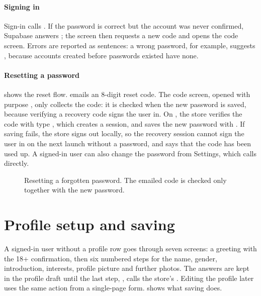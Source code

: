 \paragraph{Signing in} Sign-in calls . If the password is correct but the
account was never confirmed, Supabase answers ; the screen then requests a new
code and opens the code screen. Errors are reported as sentences: a wrong password, for example, suggests
, because accounts created before passwords existed have none.

\paragraph{Resetting a password}  shows the reset flow.  emails
an 8-digit reset code. The code screen, opened with purpose , only collects the code: it is
checked when the new password is saved, because verifying a recovery code signs the user in. On
, the store verifies the code with type , which creates a session, and
saves the new password with . If saving fails, the store signs out locally, so the
recovery session cannot sign the user in on the next launch without a password, and says that the code
has been used up. A signed-in user can also change the password from Settings, which calls
 directly.

\begin{figure}[ht]
  \centering
  
  \caption{Resetting a forgotten password. The emailed code is checked only together with the new
    password.}
  \label{fig:seq-reset}
\end{figure}

\section{Profile setup and saving}
\label{sec:flow-profile}

A signed-in user without a profile row goes through seven screens: a greeting with the 18+ confirmation,
then six numbered steps for the name, gender, introduction, interests, profile picture and further
photos. The answers are kept in the profile draft until the last step, , calls the store's
. Editing the profile later uses the same action from a single-page form.
 shows what saving does.


